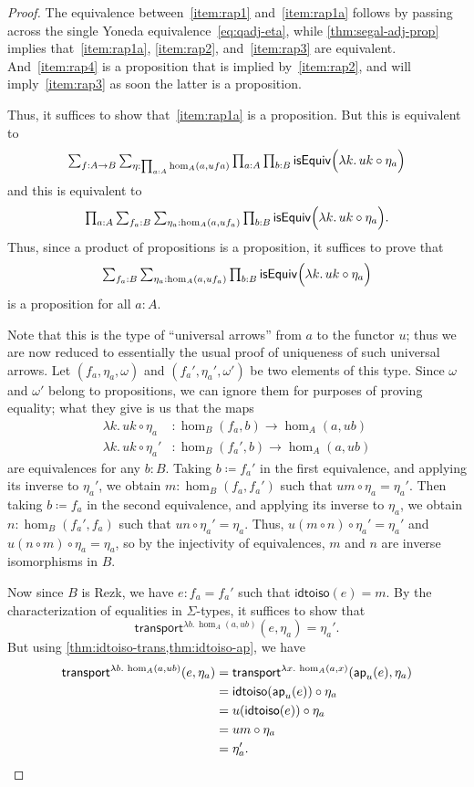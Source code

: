 \documentclass{amsart}
\theoremstyle{plain}
\theoremstyle{definition}
\theoremstyle{remark}
\numberwithin{equation}{section}
\newcommand{\tprod}{\textstyle\prod}
\newcommand{\tsum}{\textstyle\sum}
\newcommand{\defeq}{\coloneqq}
\newcommand{\idtoiso}{\mathsf{idtoiso}}
\newcommand{\lam}[1]{\lambda #1.\,}
\newcommand{\isequiv}[1]{\mathsf{isEquiv}\Parens{#1}}
\newcommand{\transport}[3]{\mathsf{transport}^{#1}(#2,#3)}%
\newcommand{\ap}{\mathsf{ap}}                             %
\newcommand{\Parens}[1]{\Bigl(#1\Bigr)}
\begin{document}
\begin{proof}
  The equivalence between~\ref{item:rap1} and~\ref{item:rap1a} follows by passing across the single Yoneda equivalence~\eqref{eq:qadj-eta}, while \cref{thm:segal-adj-prop} implies that~\ref{item:rap1a}, \ref{item:rap2}, and~\ref{item:rap3} are equivalent.
  And~\ref{item:rap4} is a proposition that is implied by~\ref{item:rap2}, and will imply~\ref{item:rap3} as soon the latter is a proposition.
  
  Thus, it suffices to show that~\ref{item:rap1a} is a proposition.
  But this is equivalent to
  \[ \tsum_{f:A\to B} \tsum_{\eta:\prod_{a:A} \hom_A(a,ufa)} \tprod_{a:A} \tprod_{b:B} \isequiv{\lam{k} u k \circ \eta_a}\]
  and this is equivalent to
  \[ \tprod_{a:A} \tsum_{f_a:B} \tsum_{\eta_a:\hom_A(a,uf_a)} \tprod_{b:B} \isequiv{\lam{k} u k \circ \eta_a}.\]
  Thus, since a product of propositions is a proposition, it suffices to prove that 
  \[ \tsum_{f_a:B} \tsum_{\eta_a:\hom_A(a,uf_a)} \tprod_{b:B} \isequiv{\lam{k} u k \circ \eta_a}\]
  is a proposition for all $a:A$.

  Note that this is the type of ``universal arrows'' from $a$ to the functor $u$; thus we are now reduced to essentially the usual proof of uniqueness of such universal arrows.
  Let $(f_a,\eta_a,\omega)$ and $(f_a',\eta_a',\omega')$ be two elements of this type.
  Since $\omega$ and $\omega'$ belong to propositions, we can ignore them for purposes of proving equality; what they give is us that the maps
  \begin{align*}
    \lam{k} u k \circ \eta_a &: \hom_B(f_a,b) \to \hom_A(a,ub)\\
    \lam{k} u k \circ \eta_a' &: \hom_B(f_a',b) \to \hom_A(a,ub)
  \end{align*}
  are equivalences for any $b:B$.
  Taking $b\defeq f_a'$ in the first equivalence, and applying its inverse to $\eta_a'$, we obtain $m:\hom_B(f_a,f_a')$ such that $um\circ\eta_a = \eta_a'$.
  Then taking $b\defeq f_a$ in the second equivalence, and applying its inverse to $\eta_a$, we obtain $n:\hom_B(f_a',f_a)$ such that $un\circ\eta_a'= \eta_a$.
  Thus, $u(m\circ n) \circ\eta_a' = \eta_a'$ and $u(n\circ m) \circ \eta_a = \eta_a$, so by the injectivity of equivalences, $m$ and $n$ are inverse isomorphisms in $B$.

  Now since $B$ is Rezk, we have $e:f_a=f_a'$ such that $\idtoiso(e) = m$.
  By the characterization of equalities in $\Sigma$-types, it suffices to show that
  \[\transport{\lam{b} \hom_A(a,ub)}{e}{\eta_a} = \eta_a'.\]
  But using \cref{thm:idtoiso-trans,thm:idtoiso-ap}, we have
  \begin{align*}
    \transport{\lam{b} \hom_A(a,ub)}{e}{\eta_a}
    &= \transport{\lam{x} \hom_A(a,x)}{\ap_u(e)}{\eta_a}\\
    &= \idtoiso(\ap_u(e)) \circ \eta_a\\
    &= u(\idtoiso(e)) \circ \eta_a\\
    &= um \circ \eta_a\\
    &= \eta_a'.\qedhere
  \end{align*}
\end{proof}
\end{document}
